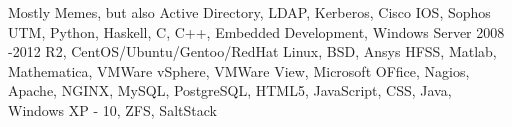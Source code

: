 
\begin{cventries}
    \begin{cvitems}
    \item {Mostly Memes, but also Active Directory, LDAP, Kerberos, Cisco IOS, Sophos UTM, Python, Haskell, C, C++, Embedded Development, Windows Server 2008 -2012 R2, CentOS/Ubuntu/Gentoo/RedHat Linux, BSD, Ansys HFSS, Matlab, Mathematica, VMWare vSphere, VMWare View, Microsoft OFfice, Nagios, Apache, NGINX, MySQL, PostgreSQL, HTML5, JavaScript, CSS, Java, Windows XP - 10, ZFS, SaltStack}
    \end{cvitems}
\end{cventries}
